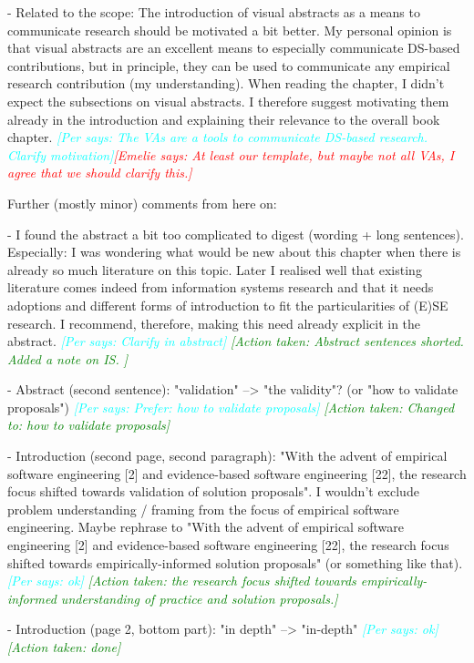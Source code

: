 \documentclass{article}
\newcommand{\emelie}[1]{\textcolor{red}{{\it [Emelie says: #1]}}}
\newcommand{\per}[1]{\textcolor{cyan}{{\it [Per says: #1]}}}
\newcommand{\action}[1]{\textcolor{green}{{\it [Action taken: #1]}}}
\newcommand{\emelie}[1]{}
\newcommand{\per}[1]{}
\newcommand{\action}[1]{}
\begin{document}
- Related to the scope: The introduction of visual abstracts as a means to communicate research should be motivated a bit better. My personal opinion is that visual abstracts are an excellent means to especially communicate DS-based contributions, but in principle, they can be used to communicate any empirical research contribution (my understanding). When reading the chapter, I didn't expect the subsections on visual abstracts. I therefore suggest motivating them already in the introduction and explaining their relevance to the overall book chapter. \per{The VAs are a tools to communicate DS-based research. Clarify motivation}\emelie{At least our template, but maybe not all VAs, I agree that we should clarify this.}


Further (mostly minor) comments from here on:

- I found the abstract a bit too complicated to digest (wording + long sentences). Especially: I was wondering what would be new about this chapter when there is already so much literature on this topic. Later I realised well that existing literature comes indeed from information systems research and that it needs adoptions and different forms of introduction to fit the particularities of (E)SE research. I recommend, therefore, making this need already explicit in the abstract. \per{Clarify in abstract} \action{Abstract sentences shorted. Added a note on IS. }

- Abstract (second sentence): "validation" --> "the validity"? (or "how to validate proposals") \per{Prefer: how to validate proposals} \action{Changed to: how to validate proposals}

- Introduction (second page, second paragraph): "With the advent of empirical software engineering [2] and evidence-based software engineering [22], the research focus shifted towards validation of solution proposals". I wouldn't exclude problem understanding / framing from the focus of empirical software engineering. Maybe rephrase to "With the advent of empirical software engineering [2] and evidence-based software engineering [22], the research focus shifted towards empirically-informed solution proposals" (or something like that). \per{ok} \action{ the research focus shifted towards  empirically-informed understanding of practice and solution proposals.}

- Introduction (page 2, bottom part): "in depth" --> "in-depth"  \per{ok} \action{done}
\end{document}
